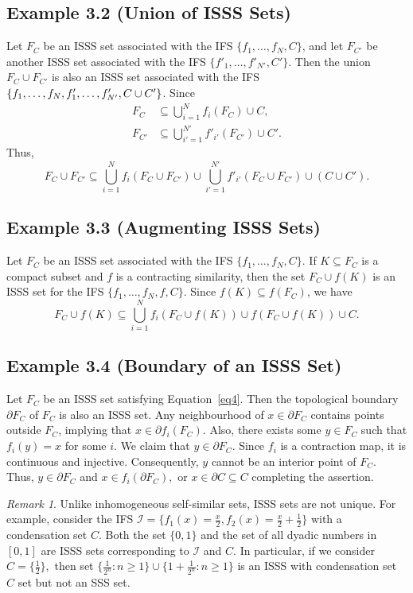 \documentclass[12pt,oneside,reqno]{amsart}
\theoremstyle{definition}
\theoremstyle{remark}
\newtheorem{remark}[theorem]{Remark}
\begin{document}
\subsection*{Example 3.2 (Union of ISSS Sets)}
Let $F_C$ be an ISSS set associated with the IFS $\{f_1, \ldots, f_N, C\}$, and let $F_{C'}$ be another ISSS set associated with the IFS $\{f'_1, \ldots, f'_{N'}, C'\}$. Then the union $F_C \cup F_{C'}$ is also an ISSS set associated with the IFS $\{f_1, \ldots, f_N, f'_1, \ldots, f'_{N'}, \\C \cup C'\}$.
Since
\begin{align*}
F_C &\subseteq \bigcup_{i=1}^N f_i(F_C) \cup C, \\
F_{C'} &\subseteq \bigcup_{i'=1}^{N'} f'_{i'}(F_{C'}) \cup C'.
\end{align*}
Thus,
\[
F_C \cup F_{C'} \subseteq \bigcup_{i=1}^N f_i(F_C \cup F_{C'}) \cup \bigcup_{i'=1}^{N'} f'_{i'}(F_C \cup F_{C'}) \cup (C \cup C').
\]

\subsection*{Example 3.3 (Augmenting ISSS Sets)}
Let $F_C$ be an ISSS set associated with the IFS $\{f_1, \ldots, f_N, C\}$. If $K \subseteq F_C$ is a compact subset and $f$ is a contracting similarity, then the set $F_C \cup f(K)$ is an ISSS set for the IFS $\{f_1, \ldots, f_N, f, C\}$. Since $f(K) \subseteq f(F_C)$, we have
\[
F_C \cup f(K) \subseteq \bigcup_{i=1}^N f_i(F_C \cup f(K)) \cup f(F_C \cup f(K)) \cup C.
\]

\subsection*{Example 3.4 (Boundary of an ISSS Set)}
Let $F_C$ be an ISSS set satisfying Equation~\eqref{eq4}. Then the topological boundary $\partial F_C$ of $F_C$ is also an ISSS set. 
 Any neighbourhood of $x \in \partial F_C$ contains points outside $F_C$, implying that $x \in \partial f_i(F_C).$ Also, there exists some $y \in F_C$ such that $f_i(y)=x$ for some $i.$ We claim that $y \in \partial F_C.$ Since $f_i$ is a contraction map, it is continuous and injective. Consequently, $y$ cannot be an interior point of $F_C$. Thus,  $y \in \partial F_C$ and $x \in f_i(\partial F_C),$ or $x \in \partial C \subseteq C$ completing the assertion.



\begin{remark}
Unlike inhomogeneous self-similar sets, ISSS sets are not unique. For example, consider the IFS $\mathcal{I} = \{f_1(x) = \frac{x}{2}, f_2(x) = \frac{x}{2} + \frac{1}{2}\}$ with a condensation set $C$. Both the set $\{0, 1\}$ and the set of all dyadic numbers in $[0, 1]$ are ISSS sets corresponding to $\mathcal{I}$ and $C$. In particular, if we consider $C=\{\frac{1}{2}\},$ then set 
$\{\frac{1}{2^n}: n \ge 1\} \cup \{1+\frac{1}{2^n}: n \ge 1\}$ is an ISSS with condensation set $C$ set but not an SSS set.
\end{remark}
\end{document}
